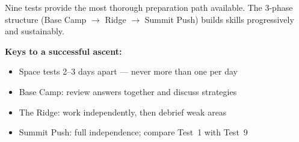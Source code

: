 {%
\begin{tcolorbox}[
    enhanced,
    colback=alpSunrise!6,
    colframe=alpSunrise!35,
    arc=6pt, boxrule=0.8pt,
    left=5mm, right=5mm, top=4mm, bottom=4mm,
    title={\textcolor{white}{\faHeart~Expedition Leader's Guide (for Parents \& Guardians)}},
    colbacktitle=alpSunrise!70,
    fonttitle=\bfseries\sffamily,
    borderline west={3pt}{0pt}{alpSunrise!50},
]
    \small\color{alpSlate}
    Nine tests provide the most thorough preparation path available.
    The 3-phase structure (Base Camp $\to$ Ridge $\to$ Summit Push)
    builds skills progressively and sustainably.

    \medskip
    \textbf{Keys to a successful ascent:}
    \begin{itemize}[leftmargin=*, itemsep=1pt]
        \item Space tests 2--3 days apart --- never more than one per day
        \item Base Camp: review answers together and discuss strategies
        \item The Ridge: work independently, then debrief weak areas
        \item Summit Push: full independence; compare Test~1 with Test~9
    \end{itemize}
\end{tcolorbox}

}

\newpage

